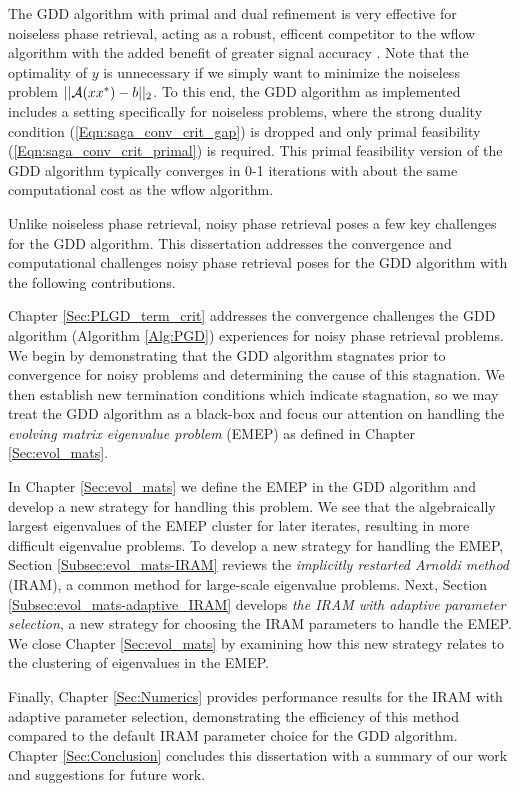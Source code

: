 The GDD algorithm with primal and dual refinement is very effective for noiseless phase retrieval, acting as a robust, efficent competitor to the wflow algorithm with the added benefit of greater signal accuracy \cite[Section 5.1.1, 5.1.3]{DBLP:journals/siamsc/FriedlanderM16}.  Note that the optimality of $y$ is unnecessary if we simply want to minimize the noiseless problem $||{\mathcal A}(xx^*) - b||_2$.  
To this end, the GDD algorithm as implemented includes a setting specifically for noiseless problems, where the strong duality condition (\ref{Eqn:saga_conv_crit_gap}) is dropped and only primal feasibility (\ref{Eqn:saga_conv_crit_primal}) is required.  
This primal feasibility version of the GDD algorithm typically converges in 0-1 iterations with about the same computational cost as the wflow algorithm.  



Unlike noiseless phase retrieval, noisy phase retrieval poses a few key challenges for the GDD algorithm.
This dissertation addresses the convergence and computational challenges noisy phase retrieval poses for the GDD algorithm with the following contributions.


Chapter \ref{Sec:PLGD_term_crit} addresses the convergence challenges the GDD algorithm (Algorithm \ref{Alg:PGD}) experiences for noisy phase retrieval problems.  
We begin by demonstrating that the GDD algorithm stagnates prior to convergence for noisy problems and determining the cause of this stagnation.  
We then establish new termination conditions which indicate stagnation, so we may treat the GDD algorithm as a black-box and focus our attention on handling the \textit{evolving matrix eigenvalue problem} (EMEP) as defined in Chapter \ref{Sec:evol_mats}.


In Chapter \ref{Sec:evol_mats} we define the EMEP in the GDD algorithm and develop a new strategy for handling this problem.
We see that the algebraically largest eigenvalues of the EMEP cluster for later iterates, resulting in more difficult eigenvalue problems.
To develop a new strategy for handling the EMEP, Section \ref{Subsec:evol_mats-IRAM} reviews the \textit{implicitly restarted Arnoldi method} (IRAM), a common method for large-scale eigenvalue problems. 
Next, Section \ref{Subsec:evol_mats-adaptive_IRAM} develops \textit{the IRAM with adaptive parameter selection}, a new strategy for choosing the IRAM parameters to handle the EMEP.  
We close Chapter \ref{Sec:evol_mats} by examining how this new strategy relates to the clustering of eigenvalues in the EMEP.


Finally, Chapter \ref{Sec:Numerics} provides performance results for the IRAM with adaptive parameter selection, demonstrating the efficiency of this method compared to the default IRAM parameter choice for the GDD algorithm.  
Chapter \ref{Sec:Conclusion} concludes this dissertation with a summary of our work and suggestions for future work.




